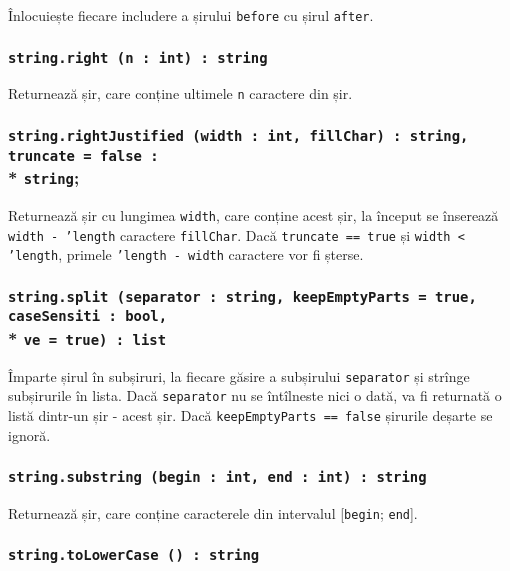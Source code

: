 Înlocuiește fiecare includere a șirului \texttt{before} cu șirul \texttt{after}.

\subsubsection{\texttt{string.right (n : int) : string}}

Returnează șir, care conține ultimele \texttt{n} caractere din șir.

\subsubsection{\texttt{string.rightJustified (width : int, fillChar) : string, truncate = false :}\\* \texttt{string};}

Returnează șir cu lungimea \texttt{width}, care conține acest șir, la început se înserează \texttt{width - 'length} caractere \texttt{fillChar}. Dacă \texttt{truncate == true} și \texttt{width < 'length}, primele \texttt{'length - width} caractere vor fi șterse.

\subsubsection{\texttt{string.split (separator : string, keepEmptyParts = true, caseSensiti : bool,}\\* \texttt{ve = true) : list}}

Împarte șirul în subșiruri, la fiecare găsire a subșirului \texttt{separator} și strînge subșirurile în lista. Dacă \texttt{separator} nu se întîlneste nici o dată, va fi returnată o listă dintr-un șir - acest șir. Dacă \texttt{keepEmptyParts == false} șirurile deșarte se ignoră.

\subsubsection{\texttt{string.substring (begin : int, end : int) : string}}

Returnează șir, care conține caracterele din intervalul [\texttt{begin}; \texttt{end}].

\subsubsection{\texttt{string.toLowerCase () : string}}

